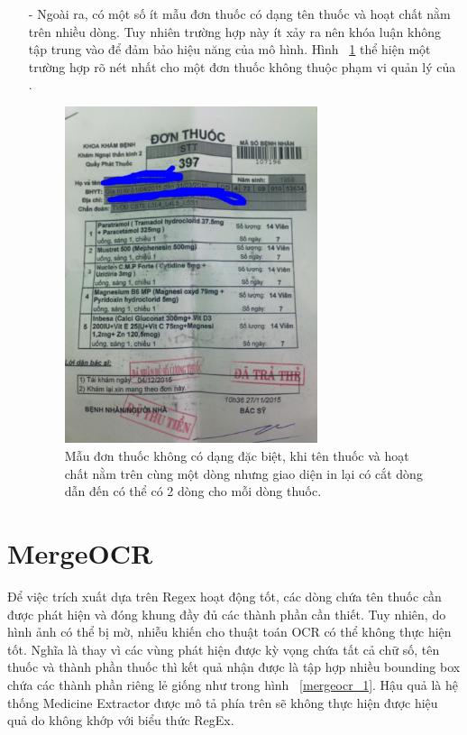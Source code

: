 \begin{itemize}
\item[-] Ngoài ra, có một số ít mẫu đơn thuốc có dạng tên thuốc và hoạt chất nằm trên nhiều dòng. Tuy nhiên trường hợp này ít xảy ra nên khóa luận không tập trung vào để đảm bảo hiệu năng của mô hình. Hình ~\ref{med_extr_rule_3} thể hiện một trường hợp rõ nét nhất cho một đơn thuốc không thuộc phạm vi quản lý của .

\begin{figure}
\centering
\includegraphics[width=0.7\textwidth]{mep_img/med_extr_rule_3.png}
\caption{Mẫu đơn thuốc không có dạng đặc biệt, khi tên thuốc và hoạt chất nằm trên cùng một dòng nhưng giao diện in lại có cắt dòng dẫn đến có thể có 2 dòng cho mỗi dòng thuốc.}\label{med_extr_rule_3}
\end{figure}

\end{itemize}

\section{MergeOCR}

Để việc trích xuất dựa trên Regex hoạt động tốt, các dòng chứa tên thuốc cần được phát hiện và đóng khung đầy đủ các thành phần cần thiết. Tuy nhiên, do hình ảnh có thể bị mờ, nhiễu khiến cho thuật toán OCR có thể không thực hiện tốt. Nghĩa là thay vì các vùng phát hiện được kỳ vọng chứa tất cả chữ số, tên thuốc và thành phần thuốc thì kết quả nhận được là tập hợp nhiều bounding box chứa các thành phần riêng lẻ giống như trong hình ~\ref{mergeocr_1}. Hậu quả là hệ thống Medicine Extractor được mô tả phía trên sẽ không thực hiện được hiệu quả do không khớp với biểu thức RegEx.

